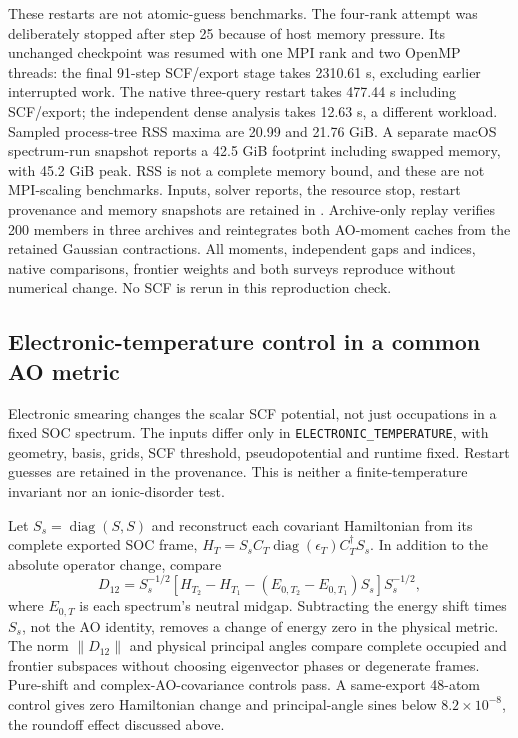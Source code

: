 \documentclass[11pt]{article}
\begin{document}
These restarts are not atomic-guess benchmarks. The four-rank
attempt was deliberately stopped after step 25 because of host
memory pressure. Its unchanged checkpoint was resumed with one
MPI rank and two OpenMP threads: the final 91-step SCF/export
stage takes 2310.61 s, excluding earlier interrupted work.
The native three-query restart takes 477.44 s including SCF/export;
the independent dense analysis takes 12.63 s, a different workload.
Sampled process-tree RSS maxima are 20.99 and 21.76 GiB.
A separate macOS spectrum-run snapshot reports a 42.5 GiB
footprint including swapped memory, with 45.2 GiB peak. RSS is
not a complete memory bound, and these are not MPI-scaling
benchmarks. Inputs, solver reports, the resource stop, restart
provenance and memory snapshots are retained
in .
Archive-only replay verifies 200 members in three archives and
reintegrates both AO-moment caches from the retained Gaussian
contractions. All moments, independent gaps and indices, native
comparisons, frontier weights and both surveys reproduce without
numerical change. No SCF is rerun in this reproduction check.

\subsection{Electronic-temperature control in a common AO metric}
Electronic smearing changes the scalar SCF potential, not just
occupations in a fixed SOC spectrum. The inputs differ only in
\texttt{ELECTRONIC\_TEMPERATURE}, with geometry, basis, grids,
SCF threshold, pseudopotential and runtime fixed. Restart guesses
are retained in the provenance. This is neither a finite-temperature
invariant nor an ionic-disorder test.

Let $S_s=\operatorname{diag}(S,S)$ and reconstruct each covariant
Hamiltonian from its complete exported SOC frame,
$H_T=S_s C_T\operatorname{diag}(\epsilon_T)C_T^\dagger S_s$.
In addition to the absolute operator change, compare
\begin{equation}
 D_{12}=S_s^{-1/2}\left[H_{T_2}-H_{T_1}
 -(E_{0,T_2}-E_{0,T_1})S_s\right]S_s^{-1/2},
\end{equation}
where $E_{0,T}$ is each spectrum's neutral midgap. Subtracting
the energy shift times $S_s$, not the AO identity, removes a
change of energy zero in the physical metric. The norm
$\|D_{12}\|$ and physical principal angles compare complete
occupied and frontier subspaces without choosing eigenvector
phases or degenerate frames. Pure-shift and complex-AO-covariance
controls pass. A same-export 48-atom control gives zero Hamiltonian
change and principal-angle sines below $8.2\times10^{-8}$,
the roundoff effect discussed above.
\end{document}
